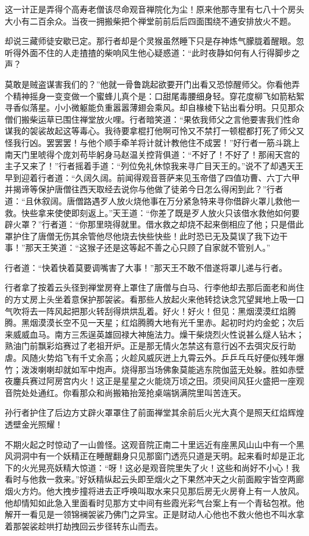 \documentclass[12pt,UTF8]{ctexbook}
\begin{document}
{这一计正是弄得个高寿老僧该尽命观音禅院化为尘！原来他那寺里有七八十个房头大小有二百余众。当夜一拥搬柴把个禅堂前前后后四面围绕不通安排放火不题。

却说三藏师徒安歇已定。那行者却是个灵猴虽然睡下只是存神炼气朦胧着醒眼。忽听得外面不住的人走揸揸的柴响风生他心疑惑道：“此时夜静如何有人行得脚步之声？

莫敢是贼盗谋害我们的？”他就一骨鲁跳起欲要开门出看又恐惊醒师父。你看他弄个精神摇身一变变做一个蜜蜂儿真个是：口甜尾毒腰细身轻。穿花度柳飞如箭粘絮寻香似落星。小小微躯能负重嚣嚣薄翅会乘风。却自椽棱下钻出看分明。只见那众僧们搬柴运草已围住禅堂放火哩。行者暗笑道：“果依我师父之言他要害我们性命谋我的袈裟故起这等毒心。我待要拿棍打他啊可怜又不禁打一顿棍都打死了师父又怪我行凶。罢罢罢！与他个顺手牵羊将计就计教他住不成罢！”好行者一筋斗跳上南天门里唬得个庞刘苟毕躬身马赵温关控背俱道：“不好了！不好了！那闹天宫的主子又来了！”行者摇着手道：“列位免礼休惊我来寻广目天王的。”说不了却遇天王早到迎着行者道：“久阔久阔。前闻得观音菩萨来见玉帝借了四值功曹、六丁六甲并揭谛等保护唐僧往西天取经去说你与他做了徒弟今日怎么得闲到此？”行者道：“且休叙阔。唐僧路遇歹人放火烧他事在万分紧急特来寻你借辟火罩儿救他一救。快些拿来使使即刻返上。”天王道：“你差了既是歹人放火只该借水救他如何要辟火罩？”行者道：“你那里晓得就里。借水救之却烧不起来倒相应了他；只是借此罩护住了唐僧无伤其余管他尽他烧去快些快些！此时恐已无及莫误了我下边干事！”那天王笑道：“这猴子还是这等起不善之心只顾了自家就不管别人。”

行者道：“快着快着莫要调嘴害了大事！”那天王不敢不借遂将罩儿递与行者。

行者拿了按着云头径到禅堂房脊上罩住了唐僧与白马、行李他却去那后面老和尚住的方丈房上头坐着意保护那袈裟。看那些人放起火来他转捻诀念咒望巽地上吸一口气吹将去一阵风起把那火转刮得烘烘乱着。好火！好火！但见：黑烟漠漠红焰腾腾。黑烟漠漠长空不见一天星；红焰腾腾大地有光千里赤。起初时灼灼金蛇；次后来威威血马。南方三炁逞英雄回禄大神施法力。燥干柴烧烈火性说甚么燧人钻木；熟油门前飘彩焰赛过了老祖开炉。正是那无情火怎禁这有意行凶不去弭灾反行助虐。风随火势焰飞有千丈余高；火趁风威灰迸上九霄云外。乒乒乓乓好便似残年爆竹；泼泼喇喇却就如军中炮声。烧得那当场佛象莫能逃东院伽蓝无处躲。胜如赤壁夜鏖兵赛过阿房宫内火！这正是星星之火能烧万顷之田。须臾间风狂火盛把一座观音院处处通红。你看那众和尚搬箱抬笼抢桌端锅满院里叫苦连天。

孙行者护住了后边方丈辟火罩罩住了前面禅堂其余前后火光大真个是照天红焰辉煌透壁金光照耀！

不期火起之时惊动了一山兽怪。这观音院正南二十里远近有座黑风山山中有一个黑风洞洞中有一个妖精正在睡醒翻身只见那窗门透亮只道是天明。起来看时却是正北下的火光晃亮妖精大惊道：“呀！这必是观音院里失了火！这些和尚好不小心！我看时与他救一救来。”好妖精纵起云头即至烟火之下果然冲天之火前面殿宇皆空两廊烟火方灼。他大拽步撞将进去正呼唤叫取水来只见那后房无火房脊上有一人放风。他却情知如此急入里面看时见那方丈中间有些霞光彩气台案上有一个青毡包袱。他解开一看见是一领锦襕袈裟乃佛门之异宝。正是财动人心他也不救火他也不叫水拿着那袈裟趁哄打劫拽回云步径转东山而去。

}
\end{document}
